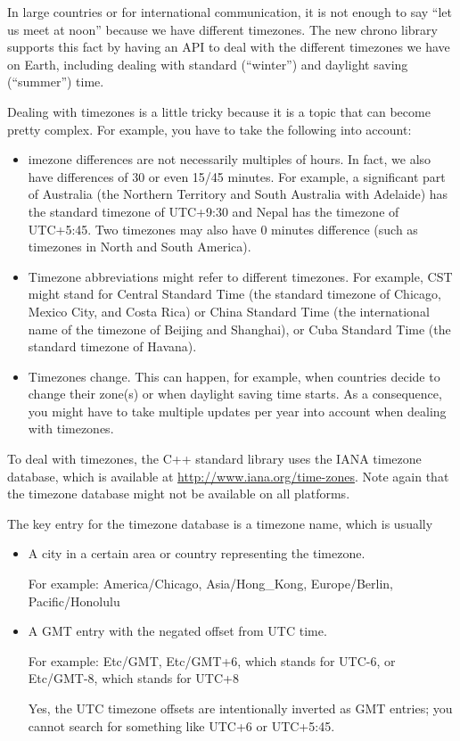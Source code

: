 

In large countries or for international communication, it is not enough to say “let us meet at noon” because we have different timezones. The new chrono library supports this fact by having an API to deal with the different timezones we have on Earth, including dealing with standard (“winter”) and daylight saving (“summer”) time.


Dealing with timezones is a little tricky because it is a topic that can become pretty complex. For example, you have to take the following into account:

\begin{itemize}
\item 
imezone differences are not necessarily multiples of hours. In fact, we also have differences of 30 or even 15/45 minutes. For example, a significant part of Australia (the Northern Territory and South Australia with Adelaide) has the standard timezone of UTC+9:30 and Nepal has the timezone of UTC+5:45.
Two timezones may also have 0 minutes difference (such as timezones in North and South America).

\item 
Timezone abbreviations might refer to different timezones. For example, CST might stand for Central Standard Time (the standard timezone of Chicago, Mexico City, and Costa Rica) or China Standard Time (the international name of the timezone of Beijing and Shanghai), or Cuba Standard Time (the standard timezone of Havana).

\item 
Timezones change. This can happen, for example, when countries decide to change their zone(s) or when daylight saving time starts. As a consequence, you might have to take multiple updates per year into account when dealing with timezones.
\end{itemize}


To deal with timezones, the C++ standard library uses the IANA timezone database, which is available at \url{http://www.iana.org/time-zones}. Note again that the timezone database might not be available on all platforms.

The key entry for the timezone database is a timezone name, which is usually

\begin{itemize}
\item 
A city in a certain area or country representing the timezone.

For example: America/Chicago, Asia/Hong\_Kong, Europe/Berlin, Pacific/Honolulu

\item 
A GMT entry with the negated offset from UTC time.

For example: Etc/GMT, Etc/GMT+6, which stands for UTC-6, or Etc/GMT-8, which stands for UTC+8 

Yes, the UTC timezone offsets are intentionally inverted as GMT entries; you cannot search for something like UTC+6 or UTC+5:45.
\end{itemize}

